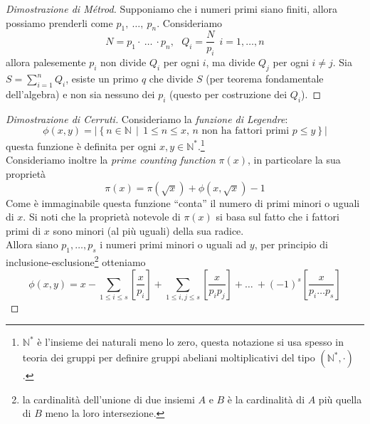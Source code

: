 \begin{proof}[Dimostrazione di Métrod] 
	Supponiamo che i numeri primi siano finiti, allora possiamo prenderli come $p_1, \ \dots, \ p_n$. Consideriamo
	\begin{equation*}
	N = p_1 \cdot \ \dots \ \cdot p_n, \ \ \ Q_i = \frac{N}{p_i} \ \ i=1,\dots,n
	\end{equation*}
	allora palesemente $p_i$ non divide $Q_i$ per ogni $i$, ma divide $Q_j$ per ogni $i\neq j$. Sia $S=\sum_{i=1}^nQ_i$, esiste un primo $q$ che divide $S$ (per teorema fondamentale dell'algebra) e non sia nessuno dei $p_i$ (questo per costruzione dei $Q_i$).
\end{proof}
\begin{proof}[Dimostrazione di Cerruti] 
	Consideriamo la \textit{funzione di Legendre}: 
	\begin{equation*}
	\phi(x,y)=\left|\left\{n\in \mathbb{N} \, \middle| \, \text{$1\leq n \leq x$, $n$ non ha fattori primi $p\leq y$}  \right\}\right|
	\end{equation*}
	questa funzione è definita per ogni $x,y \in \mathbb{N}^*$.\footnote{$\mathbb{N}^*$ è l'insieme dei naturali meno lo zero, questa notazione si usa spesso in teoria dei gruppi per definire gruppi abeliani moltiplicativi del tipo $(\mathbb{N}^*, \cdot)$.}
	\\ Consideriamo inoltre la \textit{prime counting function} $\pi(x)$, in particolare la sua proprietà
	\begin{equation*}
	\pi(x)=\pi(\sqrt{x})+\phi(x,\sqrt{x})-1
	\end{equation*}
	Come è immaginabile questa funzione \enquote{conta} il numero di primi minori o uguali di $x$. Si noti che la proprietà notevole di $\pi(x)$ si basa sul fatto che i fattori primi di $x$ sono minori (al più uguali) della sua radice. \\ Allora siano $p_1,\dots, p_s$ i numeri primi minori o uguali ad $y$, per principio di inclusione-esclusione\footnote{la cardinalità dell'unione di due insiemi $A$ e $B$ è la cardinalità di $A$ più quella di $B$ meno la loro intersezione.} otteniamo
	\begin{equation*}
	\phi(x,y)=x-\sum_{1\leq i \leq s}\left[\frac{x}{p_i}\right]+\sum_{1\leq i,j \leq s}\left[\frac{x}{p_ip_j}\right]+ \dots \ + (-1)^s\left[\frac{x}{p_i\dots p_s}\right]

\end{equation*}
\end{proof}
